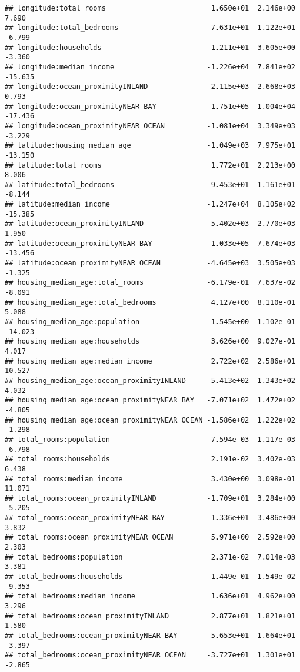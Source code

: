 \documentclass[
]{article}
\begin{document}
\begin{verbatim}
## longitude:total_rooms                         1.650e+01  2.146e+00   7.690
## longitude:total_bedrooms                     -7.631e+01  1.122e+01  -6.799
## longitude:households                         -1.211e+01  3.605e+00  -3.360
## longitude:median_income                      -1.226e+04  7.841e+02 -15.635
## longitude:ocean_proximityINLAND               2.115e+03  2.668e+03   0.793
## longitude:ocean_proximityNEAR BAY            -1.751e+05  1.004e+04 -17.436
## longitude:ocean_proximityNEAR OCEAN          -1.081e+04  3.349e+03  -3.229
## latitude:housing_median_age                  -1.049e+03  7.975e+01 -13.150
## latitude:total_rooms                          1.772e+01  2.213e+00   8.006
## latitude:total_bedrooms                      -9.453e+01  1.161e+01  -8.144
## latitude:median_income                       -1.247e+04  8.105e+02 -15.385
## latitude:ocean_proximityINLAND                5.402e+03  2.770e+03   1.950
## latitude:ocean_proximityNEAR BAY             -1.033e+05  7.674e+03 -13.456
## latitude:ocean_proximityNEAR OCEAN           -4.645e+03  3.505e+03  -1.325
## housing_median_age:total_rooms               -6.179e-01  7.637e-02  -8.091
## housing_median_age:total_bedrooms             4.127e+00  8.110e-01   5.088
## housing_median_age:population                -1.545e+00  1.102e-01 -14.023
## housing_median_age:households                 3.626e+00  9.027e-01   4.017
## housing_median_age:median_income              2.722e+02  2.586e+01  10.527
## housing_median_age:ocean_proximityINLAND      5.413e+02  1.343e+02   4.032
## housing_median_age:ocean_proximityNEAR BAY   -7.071e+02  1.472e+02  -4.805
## housing_median_age:ocean_proximityNEAR OCEAN -1.586e+02  1.222e+02  -1.298
## total_rooms:population                       -7.594e-03  1.117e-03  -6.798
## total_rooms:households                        2.191e-02  3.402e-03   6.438
## total_rooms:median_income                     3.430e+00  3.098e-01  11.071
## total_rooms:ocean_proximityINLAND            -1.709e+01  3.284e+00  -5.205
## total_rooms:ocean_proximityNEAR BAY           1.336e+01  3.486e+00   3.832
## total_rooms:ocean_proximityNEAR OCEAN         5.971e+00  2.592e+00   2.303
## total_bedrooms:population                     2.371e-02  7.014e-03   3.381
## total_bedrooms:households                    -1.449e-01  1.549e-02  -9.353
## total_bedrooms:median_income                  1.636e+01  4.962e+00   3.296
## total_bedrooms:ocean_proximityINLAND          2.877e+01  1.821e+01   1.580
## total_bedrooms:ocean_proximityNEAR BAY       -5.653e+01  1.664e+01  -3.397
## total_bedrooms:ocean_proximityNEAR OCEAN     -3.727e+01  1.301e+01  -2.865

\end{verbatim}
\end{document}
